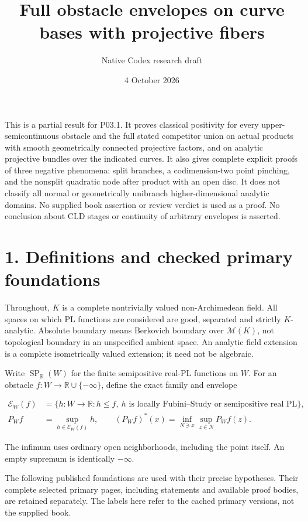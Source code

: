\documentclass[11pt,a4paper]{article}
\title{Full obstacle envelopes on curve bases with projective fibers}
\author{Native Codex research draft}
\date{4 October 2026}
\begin{document}
\maketitle

This is a partial result for P03.1. It proves classical positivity for every upper-semicontinuous obstacle and the full stated competitor union on actual products with smooth geometrically connected projective factors, and on analytic projective bundles over the indicated curves. It also gives complete explicit proofs of three negative phenomena: split branches, a codimension-two point pinching, and the nonsplit quadratic node after product with an open disc. It does not classify all normal or geometrically unibranch higher-dimensional analytic domains. No supplied book assertion or review verdict is used as a proof. No conclusion about CLD stages or continuity of arbitrary envelopes is asserted.

\section*{1. Definitions and checked primary foundations}

Throughout, \(K\) is a complete nontrivially valued non-Archimedean field. All spaces on which PL functions are considered are good, separated and strictly \(K\)-analytic. Absolute boundary means Berkovich boundary over \(\mathcal M(K)\), not topological boundary in an unspecified ambient space. An analytic field extension is a complete isometrically valued extension; it need not be algebraic.

Write \(\operatorname{SP}_{\mathbb R}(W)\) for the finite semipositive real-PL functions on \(W\). For an obstacle \(f:W\to\mathbb R\cup\{-\infty\}\), define the exact family and envelope

\[
\begin{split}
\mathcal E_W(f)&=\{h:W\to\mathbb R:h\leq f,\ h\text{ is locally Fubini--Study or semipositive real PL}\},\\
P_W f&=\sup_{h\in\mathcal E_W(f)}h,\qquad
(P_W f)^*(x)=\inf_{N\ni x}\sup_{z\in N}P_W f(z).
\end{split}
\]

The infimum uses ordinary open neighborhoods, including the point itself. An empty supremum is identically \(-\infty\).

The following published foundations are used with their precise hypotheses. Their complete selected primary pages, including statements and available proof bodies, are retained separately. The labels here refer to the cached primary versions, not the supplied book.
\end{document}
